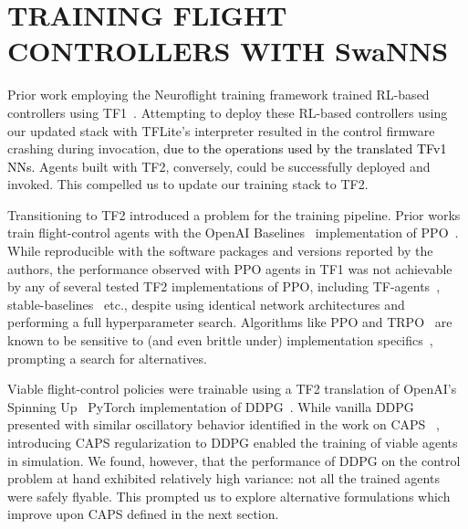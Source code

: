 \documentclass[letterpaper, 10 pt, conference]{ieeeconf} %
\newcommand{\framework}{SwaNNS}
\newcommand{\rev}[1]{\textcolor{black}{#1}}
\begin{document}
\section{TRAINING FLIGHT CONTROLLERS WITH \framework{}}

    Prior work employing the Neuroflight training framework trained RL-based controllers using TF1~\cite{NFori, NFv2, mysore2021train, mysore2021caps}.
    Attempting to deploy these RL-based controllers using our updated stack with TFLite's interpreter resulted in the control firmware crashing during invocation,
    \rev{due to the operations used by the translated TFv1 NNs.}
    Agents built with TF2, conversely, could be successfully deployed and invoked.
    This compelled us to update our training stack to TF2.
    
    Transitioning to TF2 introduced a problem for the training pipeline.
    Prior works \cite{mysore2021caps, mysore2021train, NFv2} train flight-control agents with the OpenAI Baselines~\cite{baselines} implementation of PPO~\cite{PPO}.
    While reproducible with the software packages and versions reported by the authors, the performance observed with PPO agents in TF1 was not achievable by any of several tested TF2 implementations of PPO, including TF-agents~\cite{TFAgents}, stable-baselines~\cite{stable-baselines} etc., despite using identical network architectures and performing a full hyperparameter search.
    Algorithms like PPO and TRPO~\cite{TRPO} are known to be sensitive to (and even brittle under) implementation specifics~\cite{henderson2018deep, islam2017reproducibility, Engstrom2020Implementation}, prompting a search for alternatives.
    
    Viable flight-control policies were trainable using a TF2 translation of OpenAI's Spinning Up~\cite{SpinningUp2018} PyTorch implementation of DDPG~\cite{DDPG}.
    While vanilla DDPG presented with similar oscillatory behavior identified in the work on CAPS ~\cite{mysore2021caps}, introducing CAPS regularization to DDPG enabled the training of viable agents in simulation.
    We found, however, that the performance of DDPG on the control problem at hand exhibited relatively high variance: not all the trained agents were safely flyable. This prompted us to explore alternative formulations which improve upon CAPS defined in the next section.
\end{document}
